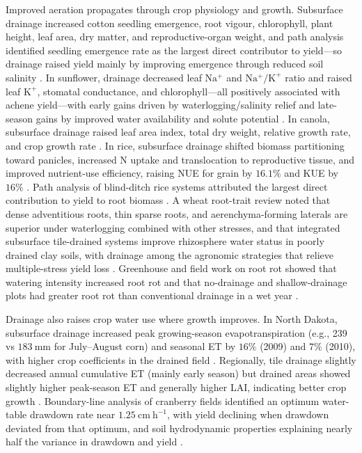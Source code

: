 \documentclass[11pt]{article}
\begin{document}
Improved aeration propagates through crop physiology and growth. Subsurface drainage increased cotton seedling emergence, root vigour, chlorophyll, plant height, leaf area, dry matter, and reproductive-organ weight, and path analysis identified seedling emergence rate as the largest direct contributor to yield—so drainage raised yield mainly by improving emergence through reduced soil salinity \parencite{Yang2022}. In sunflower, drainage decreased leaf \(\mathrm{Na^{+}}\) and \(\mathrm{Na^{+}/K^{+}}\) ratio and raised leaf \(\mathrm{K^{+}}\), stomatal conductance, and chlorophyll—all positively associated with achene yield—with early gains driven by waterlogging/salinity relief and late-season gains by improved water availability and solute potential \parencite{Islam2022}. In canola, subsurface drainage raised leaf area index, total dry weight, relative growth rate, and crop growth rate \parencite{Asgari2021}. In rice, subsurface drainage shifted biomass partitioning toward panicles, increased N uptake and translocation to reproductive tissue, and improved nutrient-use efficiency, raising NUE for grain by \(16.1\%\) and KUE by \(16\%\) \parencite{DarziNaftchali2022b}. Path analysis of blind-ditch rice systems attributed the largest direct contribution to yield to root biomass \parencite{Qi2025b}. A wheat root-trait review noted that dense adventitious roots, thin sparse roots, and aerenchyma-forming laterals are superior under waterlogging combined with other stresses, and that integrated subsurface tile-drained systems improve rhizosphere water status in poorly drained clay soils, with drainage among the agronomic strategies that relieve multiple-stress yield loss \parencite{Chen2025b}. Greenhouse and field work on root rot showed that watering intensity increased root rot and that no-drainage and shallow-drainage plots had greater root rot than conventional drainage in a wet year \parencite{Han2017}.

Drainage also raises crop water use where growth improves. In North Dakota, subsurface drainage increased peak growing-season evapotranspiration (e.g., 239 vs \(183\ \mathrm{mm}\) for July--August corn) and seasonal ET by \(16\%\) (2009) and \(7\%\) (2010), with higher crop coefficients in the drained field \parencite{Rijal2012}. Regionally, tile drainage slightly decreased annual cumulative ET (mainly early season) but drained areas showed slightly higher peak-season ET and generally higher LAI, indicating better crop growth \parencite{Yang2017,Yang2022}. Boundary-line analysis of cranberry fields identified an optimum water-table drawdown rate near \(1.25\ \mathrm{cm\ h^{-1}}\), with yield declining when drawdown deviated from that optimum, and soil hydrodynamic properties explaining nearly half the variance in drawdown and yield \parencite{Bulot2017}.
\end{document}
